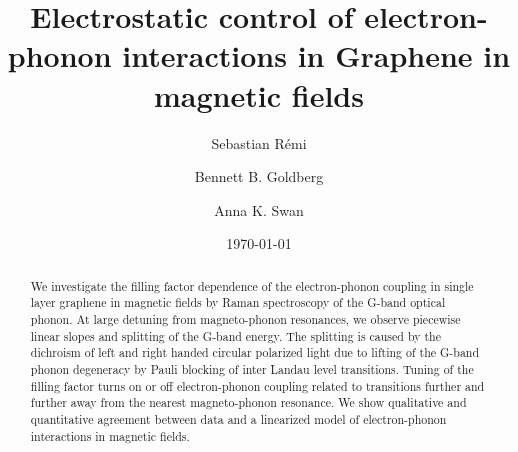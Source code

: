 \documentclass[prl,aps,superscriptaddress,showpacs,reprint]{revtex4-1}
\begin{document}
\title{Electrostatic control of electron-phonon interactions in Graphene in magnetic fields} %

\author{Sebastian R\'{e}mi}

\author{Bennett B. Goldberg}


\author{Anna K. Swan}

\date{\today}

\begin{abstract}
We investigate the filling factor dependence of the electron-phonon coupling in single layer graphene in magnetic fields by Raman spectroscopy of the G-band optical phonon. At large detuning from magneto-phonon resonances, we observe piecewise linear slopes and splitting of the G-band energy. The splitting is caused by the dichroism of left and right handed circular polarized light due to lifting of the G-band phonon degeneracy by Pauli blocking of inter Landau level transitions. Tuning of the filling factor turns on or off electron-phonon coupling related to transitions further and further away from the nearest magneto-phonon resonance.  We show qualitative and quantitative agreement between data and a linearized model of electron-phonon interactions in magnetic fields.
\end{abstract}





\maketitle %
\end{document}
